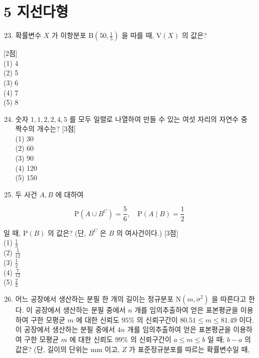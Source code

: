 \documentclass[10pt]{article}
\begin{document}
\section*{5 지선다형}
\begin{enumerate}
  \setcounter{enumi}{22}
  \item 확률변수 $X$ 가 이항분포 $\mathrm{B}\left(50, \frac{1}{5}\right)$ 을 따를 때, $\mathrm{V}(X)$ 의 값은?
\end{enumerate}

[2점]\\
(1) 4\\
(2) 5\\
(3) 6\\
(4) 7\\
(5) 8

\begin{enumerate}
  \setcounter{enumi}{23}
  \item 숫자 $1,1,2,2,4,5$ 를 모두 일렬로 나열하여 만들 수 있는 여섯 자리의 자연수 중 짝수의 개수는? [3점]\\
(1) 30\\
(2) 60\\
(3) 90\\
(4) 120\\
(5) 150

  \item 두 사건 $A, B$ 에 대하여

\end{enumerate}

\[
\mathrm{P}\left(A \cup B^{C}\right)=\frac{5}{6}, \quad \mathrm{P}(A \mid B)=\frac{1}{2}
\]

일 때, $\mathrm{P}(B)$ 의 값은? (단, $B^{C}$ 은 $B$ 의 여사건이다.) [3점]\\
(1) $\frac{1}{3}$\\
(2) $\frac{5}{12}$\\
(3) $\frac{1}{2}$\\
(4) $\frac{7}{12}$\\
(5) $\frac{2}{3}$

\begin{enumerate}
  \setcounter{enumi}{25}
  \item 어느 공장에서 생산하는 분필 한 개의 길이는 정규분포 $\mathrm{N}\left(m, \dot{\sigma}^{2}\right)$ 을 따른다고 한다. 이 공장에서 생산하는 분필 중에서 $n$ 개를 임의추출하여 얻은 표본평균을 이용하여 구한 모평균 $m$ 에 대한 신뢰도 $95 \%$ 의 신뢰구간이 $80.51 \leq m \leq 81.49$ 이다. 이 공장에서 생산하는 분필 중에서 $4 n$ 개를 임의추출하여 얻은 표본평균을 이용하여 구한 모평균 $m$ 에 대한 신뢰도 $99 \%$ 의 신뢰구간이 $a \leq m \leq b$ 일 때; $b-a$ 의 값은? (단, 길이의 단위는 mm 이고, $Z$ 가 표준정규분포를 따르는 확률변수일 때,
\end{enumerate}
\end{document}
